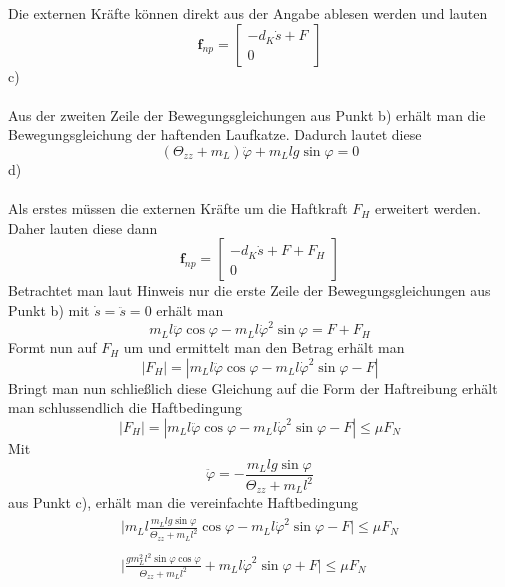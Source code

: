 Die externen Kräfte können direkt aus der Angabe ablesen werden und lauten
\[
	\textbf{f}_{np} = \begin{bmatrix}
		-d_K\dot{s} + F \\ 
		0
	\end{bmatrix}
\]
c) \\ \\
Aus der zweiten Zeile der Bewegungsgleichungen aus Punkt b) erhält man die Bewegungsgleichung der haftenden Laufkatze. Dadurch lautet diese
\[
	(\Theta_{zz} + m_L)\ddot{\varphi} + m_Llg\sin\varphi = 0
\]
d) \\ \\
Als erstes müssen die externen Kräfte um die Haftkraft $F_H$ erweitert werden. Daher lauten diese dann
\[
	\textbf{f}_{np} = \begin{bmatrix}
	-d_K\dot{s} + F + F_H\\ 
	0
	\end{bmatrix}
\]
Betrachtet man laut Hinweis nur die erste Zeile der Bewegungsgleichungen aus Punkt b) mit $\dot{s} = \ddot{s} = 0$ erhält man
\[
	m_Ll\ddot{\varphi}\cos\varphi - m_Ll\dot{\varphi}^2\sin\varphi = F + F_H
\] 
Formt nun auf $F_H$ um und ermittelt man den Betrag erhält man
\[
	|F_H| = |m_Ll\ddot{\varphi}\cos\varphi - m_Ll\dot{\varphi}^2\sin\varphi - F|
\]
Bringt man nun schließlich diese Gleichung auf die Form der Haftreibung erhält man schlussendlich die Haftbedingung
\[
	|F_H| = |m_Ll\ddot{\varphi}\cos\varphi - m_Ll\dot{\varphi}^2\sin\varphi - F| \leq \mu F_N
\]
Mit
\[
	\ddot{\varphi} = - \frac{m_Llg\sin\varphi}{\Theta_{zz} + m_Ll^2}
\]
aus Punkt c), erhält man die vereinfachte Haftbedingung
\begin{align*}
	\biggl|m_Ll\frac{m_Llg\sin\varphi}{\Theta_{zz} + m_Ll^2}\cos\varphi - m_Ll\dot{\varphi}^2\sin\varphi - F\biggl| \leq \mu F_N \\ \\
	\biggl|\frac{gm^2_Ll^2\sin\varphi\cos\varphi}{\Theta_{zz} + m_Ll^2} + m_Ll\dot{\varphi}^2\sin\varphi + F\biggl| \leq \mu F_N
\end{align*}